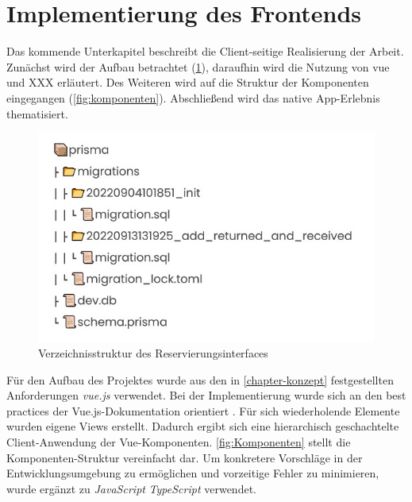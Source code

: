 
\section{Implementierung des Frontends}  Das kommende Unterkapitel
beschreibt die Client-seitige Realisierung der Arbeit. Zunächst wird der
Aufbau betrachtet (\ref{fig:vue}), daraufhin wird die Nutzung von vue und XXX
erläutert. Des Weiteren wird auf die Struktur der Komponenten eingegangen
(\ref{fig:komponenten}). Abschließend wird das native App-Erlebnis
thematisiert.

\begin{figure}[h]
  \centering
  \includegraphics[scale=0.7]{Bilder/Db.jpg}
  \caption[Verzeichnisstruktur des Reservierungsinterfaces]{Verzeichnisstruktur des Reservierungsinterfaces}
  \label{fig:vue}
\end{figure}

Für den Aufbau des Projektes wurde aus den in \ref{chapter-konzept}
festgestellten Anforderungen \textit{vue.js} verwendet. Bei der Implementierung
wurde sich an den best practices der Vue.js-Dokumentation orientiert
. Für sich wiederholende Elemente wurden eigene Views
erstellt. Dadurch ergibt sich eine hierarchisch geschachtelte Client-Anwendung
der Vue-Komponenten. \ref{fig:Komponenten} stellt die Komponenten-Struktur
vereinfacht dar. Um konkretere Vorschläge in der Entwicklungsumgebung zu
ermöglichen und vorzeitige Fehler zu minimieren, wurde ergänzt zu
\textit{JavaScript} \textit{TypeScript} verwendet.


